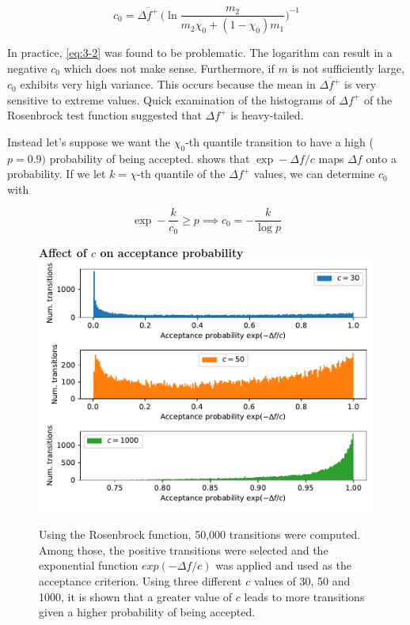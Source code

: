 \begin{equation}
\label{eq:3-2}
    c_0 = \overline{\Delta {f}^+} \, \Bigg(\ln \dfrac{m_2}{m_2 \chi_0+(1-\chi_0)m_1} \Bigg)^{-1} 
\end{equation}

In practice, \cref{eq:3-2} was found to be problematic. The logarithm can result in a negative $c_0$ which does not make sense.
Furthermore, if $m$ is not sufficiently large, $c_0$ exhibits very high variance. This occurs because the mean in 
$\overline{\Delta f^+}$ is very sensitive to extreme values. Quick examination of the histograms of $\Delta f^+$ of the Rosenbrock
test function suggested that $\Delta f^+$ is heavy-tailed.

Instead let's suppose we want the $\chi_0$-th quantile transition to have a high ($p=0.9)$ probability of being accepted. 
 shows that $\exp -\Delta f / c$ maps $\Delta f$ onto a probability. If we let $k=\chi$-th quantile of the
$\Delta f^+$ values, we can determine $c_0$ with


\begin{equation}
    \label{eq:schedule_init}
    \exp - \frac{k}{c_0} \geq p \implies c_0 = -\frac{k}{\log p}
\end{equation}

\begin{figure}
    \centering
    \textbf{Affect of $c$ on acceptance probability}
    \includegraphics[scale=0.5]{figures/fig33.pdf}
    \label{fig:acceptance}
    
  \caption{Using the Rosenbrock function, 50,000 transitions were computed. Among those, the positive transitions were selected and the exponential function $exp(-\Delta f/c)$  was applied and used as the acceptance criterion. Using three different $c$ values of 30, 50 and 1000, it is shown that a greater value of $c$ leads to more transitions given a higher probability of being accepted.}
\end{figure}

